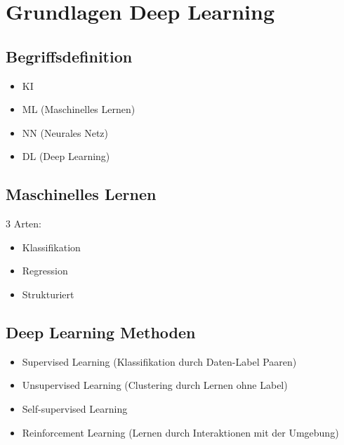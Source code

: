 \documentclass[a4paper]{article}
\title{\docTitle}
\author{Moritz}
\date{\today}
\begin{document}
\maketitle
\tableofcontents


\section{Grundlagen Deep Learning}

\subsection{Begriffsdefinition}

\begin{itemize}
    \item KI
    \item ML (Maschinelles Lernen)
    \item NN (Neurales Netz)
    \item DL (Deep Learning)
\end{itemize}

\subsection{Maschinelles Lernen}

3 Arten:

\begin{itemize}
    \item Klassifikation
    \item Regression
    \item Strukturiert
\end{itemize}

\subsection{Deep Learning Methoden}

\begin{itemize}
    \item Supervised Learning (Klassifikation durch Daten-Label Paaren)
    \item Unsupervised Learning (Clustering durch Lernen ohne Label)
    \item Self-supervised Learning
    \item Reinforcement Learning (Lernen durch Interaktionen mit der Umgebung)
\end{itemize}
\end{document}
